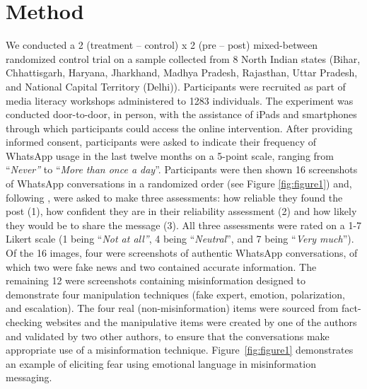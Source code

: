\documentclass[empirical, authordate]{jote-new-article}
\begin{document}
\section{Method}

We conducted a 2 (treatment -- control) x 2 (pre -- post) mixed-between randomized control trial on a sample collected from 8 North Indian states (Bihar, Chhattisgarh, Haryana, Jharkhand, Madhya Pradesh, Rajasthan, Uttar Pradesh, and National Capital Territory (Delhi)). Participants were recruited as part of media literacy workshops administered to 1283 individuals. The experiment was conducted door-to-door, in person, with the assistance of iPads and smartphones through which participants could access the online intervention. After providing informed consent, participants were asked to indicate their frequency of \mbox{WhatsApp} usage in the last twelve months on a 5-point scale, ranging from “\emph{Never”} to “\emph{More than once a day}”. Participants were then shown 16 screenshots of \mbox{WhatsApp} conversations in a randomized order (see Figure \ref{fig:figure1}) and, following \textcite{Roozenbeek2021}, were asked to make three assessments: how reliable they found the post (1), how confident they are in their reliability assessment (2) and how likely they would be to share the message (3). All three assessments were rated on a 1-7 Likert scale (1 being “\emph{Not at all”}, 4 being “\emph{Neutral}”, and 7 being “\emph{Very much}”). Of the 16 images, four were screenshots of authentic \mbox{WhatsApp} conversations, of which two were fake news and two contained accurate information. The remaining 12 were screenshots containing misinformation designed to demonstrate four manipulation techniques (fake expert, emotion, polarization, and escalation). The four real (non-misinformation) items were sourced from fact-checking websites and the manipulative items were created by one of the authors and validated by two other authors, to ensure that the conversations make appropriate use of a misinformation technique. Figure~\ref{fig:figure1} demonstrates an example of eliciting fear using emotional language in misinformation messaging.
\end{document}
